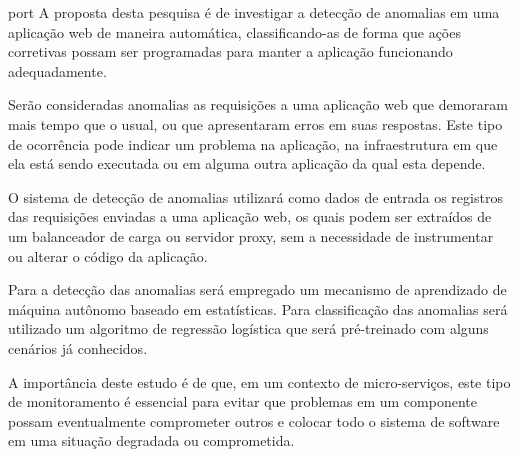 
\begin{resumo}{port}
A proposta desta pesquisa é de investigar a detecção de anomalias em uma
aplicação web de maneira automática, classificando-as de forma que ações
corretivas possam ser programadas para manter a aplicação funcionando
adequadamente.

Serão consideradas anomalias as requisições a uma aplicação web que
demoraram mais tempo que o usual, ou que apresentaram erros em suas
respostas. Este tipo de ocorrência pode indicar um problema na aplicação,
na infraestrutura em que ela está sendo executada ou em alguma outra
aplicação da qual esta depende.

O sistema de detecção de anomalias utilizará como dados de entrada os
registros das requisições enviadas a uma aplicação web, os quais podem
ser extraídos de um balanceador de carga ou servidor proxy, sem a
necessidade de instrumentar ou alterar o código da aplicação.

Para a detecção das anomalias será empregado um mecanismo de aprendizado
de máquina autônomo baseado em estatísticas. Para classificação das
anomalias será utilizado um algoritmo de regressão logística que será
pré-treinado com alguns cenários já conhecidos.

A importância deste estudo é de que, em um contexto de micro-serviços,
este tipo de monitoramento é essencial para evitar que problemas em um
componente possam eventualmente comprometer outros e colocar todo o
sistema de software em uma situação degradada ou comprometida.
\end{resumo}
